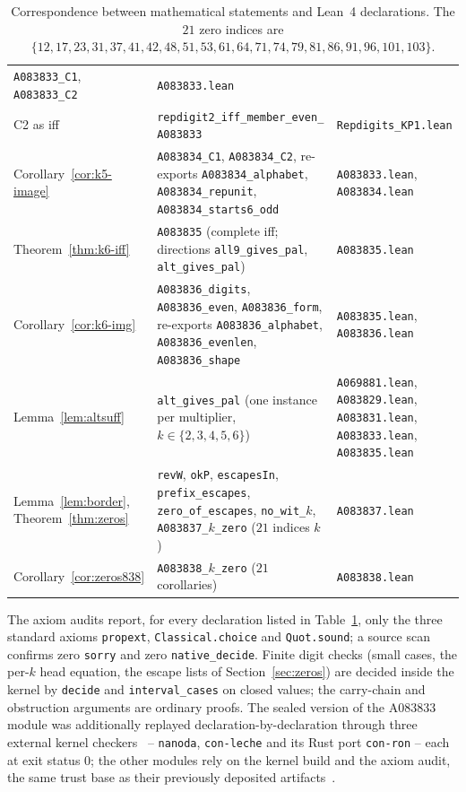 \documentclass[12pt]{article}
\begin{document}
\begin{table}[ht]
{\begin{tabular}{>{\raggedright\arraybackslash}p{4.4cm}%
>{\raggedright\arraybackslash}p{6.0cm}%
>{\raggedright\arraybackslash}p{3.8cm}}
\texttt{A083833\_C1}, \texttt{A083833\_C2} &
\texttt{A083833.lean} \\
C2 as iff & \texttt{repdigit2\_iff\_member\_even\_}%
\allowbreak \texttt{A083833} &
\texttt{Repdigits\_KP1.lean} \\
Corollary~\ref{cor:k5-image} &
\texttt{A083834\_C1}, \texttt{A083834\_C2}, re-exports
\texttt{A083834\_alphabet}, \texttt{A083834\_repunit},
\texttt{A083834\_starts6\_odd} & \texttt{A083833.lean},
\texttt{A083834.lean} \\
Theorem~\ref{thm:k6-iff} & \texttt{A083835} (complete iff;
directions \texttt{all9\_gives\_pal},
\texttt{alt\_gives\_pal}) & \texttt{A083835.lean} \\
Corollary~\ref{cor:k6-img} &
\texttt{A083836\_digits}, \texttt{A083836\_even},
\texttt{A083836\_form}, re-exports
\texttt{A083836\_alphabet}, \texttt{A083836\_evenlen},
\texttt{A083836\_shape} & \texttt{A083835.lean},
\texttt{A083836.lean} \\
Lemma~\ref{lem:altsuff} & \texttt{alt\_gives\_pal}
(one instance per multiplier, $k \in \{2,3,4,5,6\}$) &
\texttt{A069881.lean}, \texttt{A083829.lean},
\texttt{A083831.lean}, \texttt{A083833.lean},
\texttt{A083835.lean} \\
Lemma~\ref{lem:border}, Theorem~\ref{thm:zeros} &
\texttt{revW}, \texttt{okP}, \texttt{escapesIn},
\texttt{prefix\_escapes}, \texttt{zero\_of\_escapes},
\texttt{no\_wit\_}$k$, \texttt{A083837\_}$k$\texttt{\_zero}
($21$ indices $k$) & \texttt{A083837.lean} \\
Corollary~\ref{cor:zeros838} &
\texttt{A083838\_}$k$\texttt{\_zero} ($21$ corollaries) &
\texttt{A083838.lean} \\
\hline
\end{tabular}}
\caption{Correspondence between mathematical statements
and Lean~4 declarations. The $21$ zero indices are
$\{12,17,23,31,37,41,42,48,51,53,61,64,71,74,79,81,86,
91,96,101,103\}$.}
\label{tab:lean}
\end{table}

The axiom audits report, for every declaration listed in
Table~\ref{tab:lean}, only the three standard axioms
\texttt{propext}, \texttt{Classical.choice} and
\texttt{Quot.sound}; a source scan confirms zero
\texttt{sorry} and zero \texttt{native\_decide}. Finite
digit checks (small cases, the per-$k$ head equation,
the escape lists of Section~\ref{sec:zeros}) are decided
inside the kernel by \texttt{decide} and
\texttt{interval\_cases} on closed values; the carry-chain
and obstruction arguments are ordinary proofs. The sealed
version of the A083833 module was additionally replayed
declaration-by-declaration through three external kernel
checkers~\cite{kernels} -- \texttt{nanoda},
\texttt{con-leche} and its Rust port \texttt{con-ron} --
each at exit status $0$; the other modules rely on the
kernel build and the axiom audit, the same trust base as
their previously deposited artifacts~\cite{artifacts}.
\end{document}
